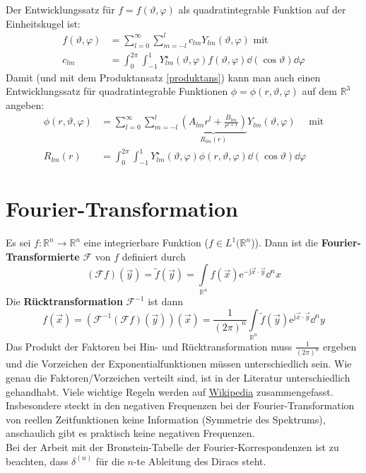 		   Der Entwicklungssatz für $f=f(\vartheta,\varphi)$ als quadratintegrable Funktion auf der Einheitskugel ist:
		  \begin{align}
		  	f(\vartheta,\varphi) &= \sum_{l=0}^{\infty}\sum_{m=-l}^l  c_{lm} Y_{lm}(\vartheta,\varphi) \text{ mit}\\
		  	c_{lm} & = \int_0^{2\pi}\int_{-1}^1  Y_{lm}^\star(\vartheta,\varphi) f(\vartheta,\varphi) \dd(\cos\vartheta)\dd\varphi            
		  \end{align}
		   Damit (und mit dem Produktansatz \ref{produktans}) kann man auch einen Entwicklungssatz für quadratintegrable Funktionen $\phi=\phi(r, \vartheta,\varphi)$  auf dem $\mathbb{R}^3$ angeben:
		  \begin{align}\label{entwicklungKugelf}
		  	\phi(r, \vartheta,\varphi) &= \sum_{l=0}^{\infty}\sum_{m=-l}^l  \underbrace{\left(A_{lm} r^l+\frac{B_{lm}}{r^{l+1}}\right)}_{R_{lm}(r)} Y_{lm}(\vartheta,\varphi) \quad \text{ mit}\\
		  	R_{lm}(r) & = \int_0^{2\pi}\int_{-1}^1  Y_{lm}^\star(\vartheta,\varphi) \phi(r,\vartheta,\varphi) \dd(\cos\vartheta) \dd\varphi            
		  \end{align}
		  
 \section{Fourier-Transformation}\label{fourtrans}

  Es sei \(f: \mathbb{R}^n \to \mathbb{R}^n\) eine integrierbare Funktion (\(f \in L^1(\mathbb{R}^n\))). Dann ist die \textbf{Fourier-Transformierte} ${\mathcal F}$ von \(f\) definiert durch
  \begin{equation}
	  \boxed{({\mathcal F}f)(\vec{y}) = \tilde{f}(\vec{y}) = \int\limits_{\mathbb{R}^n} f(\vec{x})  \mathrm{e}^{-\mathrm{j}\vec{x}\cdot\vec{y}} \dd^n x}
  \end{equation}
  Die \textbf{Rücktransformation} ${\mathcal F}^{-1}$ ist dann
  \begin{equation}
	  \boxed{f(\vec{x}) = ({\mathcal F}^{-1} ({\mathcal F}f)(\vec{y}))(\vec{x}) = \frac{1}{(2\pi)^n} \int\limits_{\mathbb{R}^n} \tilde{f}(\vec{y})  \mathrm{e}^{\mathrm{j}\vec{x}\cdot\vec{y}} \dd^n y}
  \end{equation}
	  Das Produkt der Faktoren bei Hin- und Rücktransformation muss \(\frac{1}{(2\pi)^n} \) ergeben und die Vorzeichen der Exponentialfunktionen müssen unterschiedlich sein. Wie genau die Faktoren/Vorzeichen verteilt sind, ist in der Literatur unterschiedlich gehandhabt. Viele wichtige Regeln werden auf \href{https://en.wikipedia.org/wiki/Multidimensional_transform}{Wikipedia} zusammengefasst. Insbesondere steckt in den negativen Frequenzen bei der Fourier-Transformation von reellen Zeitfunktionen keine Information (Symmetrie des Spektrums), anschaulich gibt es praktisch keine negativen Frequenzen.\\
	  Bei der Arbeit mit der Bronstein-Tabelle der Fourier-Korrespondenzen ist zu beachten, dass $\delta^{(n)}$ für die $n$-te Ableitung des Diracs steht.
